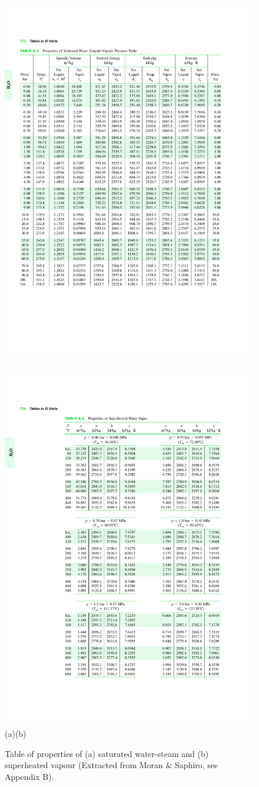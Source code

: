 \documentclass[12pts,a4paper,amsmath,amssymb,floatfix]{article}%
\begin{document}
   \begin{figure}[h]
      \vbox{
         \hbox{\includegraphics[width=.5\columnwidth,clip]{./Figs/WaterSatTable}
               \includegraphics[width=.5\columnwidth,clip]{./Figs/Water_SuperheatedTable}}
         \vspace{-1.5cm}
         \hbox{\hspace{4cm}(a)\hspace{7cm}(b)}
      }
      \caption{ Table of properties of (a) saturated water-steam and (b) superheated vapour (Extracted from Moran $\&$ Saphiro, see Appendix B).}\label{Mod03Fig03}  
   \end{figure}
%
    

\end{document}
